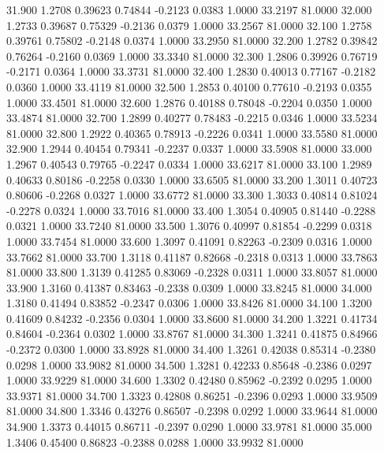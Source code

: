   31.900   1.2708   0.39623   0.74844  -0.2123   0.0383   1.0000  33.2197  81.0000
  32.000   1.2733   0.39687   0.75329  -0.2136   0.0379   1.0000  33.2567  81.0000
  32.100   1.2758   0.39761   0.75802  -0.2148   0.0374   1.0000  33.2950  81.0000
  32.200   1.2782   0.39842   0.76264  -0.2160   0.0369   1.0000  33.3340  81.0000
  32.300   1.2806   0.39926   0.76719  -0.2171   0.0364   1.0000  33.3731  81.0000
  32.400   1.2830   0.40013   0.77167  -0.2182   0.0360   1.0000  33.4119  81.0000
  32.500   1.2853   0.40100   0.77610  -0.2193   0.0355   1.0000  33.4501  81.0000
  32.600   1.2876   0.40188   0.78048  -0.2204   0.0350   1.0000  33.4874  81.0000
  32.700   1.2899   0.40277   0.78483  -0.2215   0.0346   1.0000  33.5234  81.0000
  32.800   1.2922   0.40365   0.78913  -0.2226   0.0341   1.0000  33.5580  81.0000
  32.900   1.2944   0.40454   0.79341  -0.2237   0.0337   1.0000  33.5908  81.0000
  33.000   1.2967   0.40543   0.79765  -0.2247   0.0334   1.0000  33.6217  81.0000
  33.100   1.2989   0.40633   0.80186  -0.2258   0.0330   1.0000  33.6505  81.0000
  33.200   1.3011   0.40723   0.80606  -0.2268   0.0327   1.0000  33.6772  81.0000
  33.300   1.3033   0.40814   0.81024  -0.2278   0.0324   1.0000  33.7016  81.0000
  33.400   1.3054   0.40905   0.81440  -0.2288   0.0321   1.0000  33.7240  81.0000
  33.500   1.3076   0.40997   0.81854  -0.2299   0.0318   1.0000  33.7454  81.0000
  33.600   1.3097   0.41091   0.82263  -0.2309   0.0316   1.0000  33.7662  81.0000
  33.700   1.3118   0.41187   0.82668  -0.2318   0.0313   1.0000  33.7863  81.0000
  33.800   1.3139   0.41285   0.83069  -0.2328   0.0311   1.0000  33.8057  81.0000
  33.900   1.3160   0.41387   0.83463  -0.2338   0.0309   1.0000  33.8245  81.0000
  34.000   1.3180   0.41494   0.83852  -0.2347   0.0306   1.0000  33.8426  81.0000
  34.100   1.3200   0.41609   0.84232  -0.2356   0.0304   1.0000  33.8600  81.0000
  34.200   1.3221   0.41734   0.84604  -0.2364   0.0302   1.0000  33.8767  81.0000
  34.300   1.3241   0.41875   0.84966  -0.2372   0.0300   1.0000  33.8928  81.0000
  34.400   1.3261   0.42038   0.85314  -0.2380   0.0298   1.0000  33.9082  81.0000
  34.500   1.3281   0.42233   0.85648  -0.2386   0.0297   1.0000  33.9229  81.0000
  34.600   1.3302   0.42480   0.85962  -0.2392   0.0295   1.0000  33.9371  81.0000
  34.700   1.3323   0.42808   0.86251  -0.2396   0.0293   1.0000  33.9509  81.0000
  34.800   1.3346   0.43276   0.86507  -0.2398   0.0292   1.0000  33.9644  81.0000
  34.900   1.3373   0.44015   0.86711  -0.2397   0.0290   1.0000  33.9781  81.0000
  35.000   1.3406   0.45400   0.86823  -0.2388   0.0288   1.0000  33.9932  81.0000
